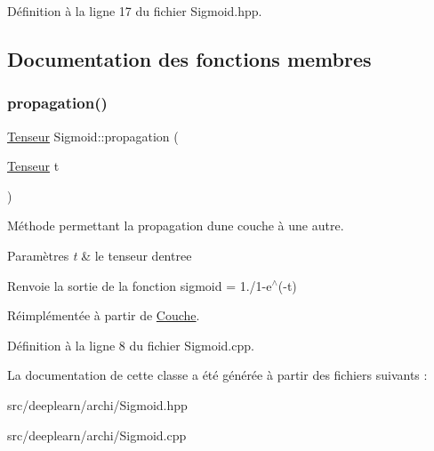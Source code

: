 Définition à la ligne 17 du fichier Sigmoid.\+hpp.



\subsection{Documentation des fonctions membres}
\mbox{\label{class_sigmoid_a6bd1f6bbc49bd7e634dc33701aee420c}} 
\subsubsection{\texorpdfstring{propagation()}{propagation()}}
{\footnotesize\ttfamily \hyperlink{class_tenseur}{Tenseur} Sigmoid\+::propagation (\begin{DoxyParamCaption}\item[{\hyperlink{class_tenseur}{Tenseur}}]{t }\end{DoxyParamCaption})\hspace{0.3cm}{\ttfamily [virtual]}}



Méthode permettant la propagation d\textquotesingle{}une couche à une autre. 


\begin{DoxyParams}{Paramètres}
{\em t} & le tenseur d\textquotesingle{}entree \\
\hline
\end{DoxyParams}
\begin{DoxyReturn}{Renvoie}
la sortie de la fonction sigmoid = 1./1-\/e$^\wedge$(-\/t) 
\end{DoxyReturn}


Réimplémentée à partir de \hyperlink{class_couche_a1f0ed59e21020f5d4f37933af4d1b1e5}{Couche}.



Définition à la ligne 8 du fichier Sigmoid.\+cpp.



La documentation de cette classe a été générée à partir des fichiers suivants \+:\begin{DoxyCompactItemize}
\item 
src/deeplearn/archi/Sigmoid.\+hpp\item 
src/deeplearn/archi/Sigmoid.\+cpp\end{DoxyCompactItemize}
